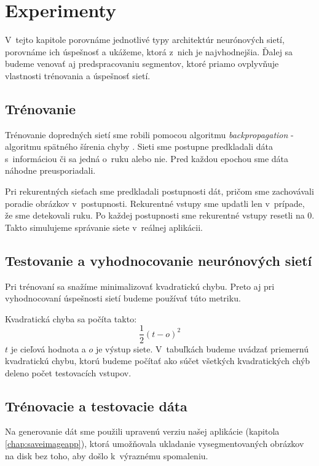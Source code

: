 \chapter{Experimenty}
\label{chap:experiments}

V~tejto kapitole porovnáme jednotlivé typy architektúr neurónových sietí, porovnáme ich úspešnosť a ukážeme, ktorá z~nich je najvhodnejšia. Ďalej sa budeme venovať aj predspracovaniu segmentov, ktoré priamo ovplyvňuje vlastnosti trénovania a úspešnosť sietí.
\bigskip

\section{Trénovanie}

Trénovanie dopredných sietí sme robili pomocou algoritmu \textit{backpropagation} - algoritmu spätného šírenia chyby \cite{haykin1999neural}. Sieti sme postupne predkladali dáta s~informáciou či sa jedná o~ruku alebo nie. Pred každou epochou sme dáta náhodne preusporiadali. 

Pri rekurentných sieťach sme predkladali postupnosti dát, pričom sme zachovávali poradie obrázkov v~postupnosti. Rekurentné vstupy sme updatli len v~prípade, že sme detekovali ruku. Po každej postupnosti sme rekurentné vstupy resetli na 0. Takto simulujeme správanie siete v~reálnej aplikácii.

\section{Testovanie a vyhodnocovanie neurónových sietí}
Pri trénovaní sa snažíme minimalizovať kvadratickú chybu. Preto aj pri vyhodnocovaní úspešnosti sietí budeme používať túto metriku.

Kvadratická chyba sa počíta takto: $$\frac{1}{2}(t-o)^2$$
$t$ je cieľová hodnota a $o$ je výstup siete. V~tabuľkách budeme uvádzať priemernú kvadratickú chybu, ktorú budeme počítať ako súčet všetkých kvadratických chýb deleno počet testovacích vstupov. 

\section{Trénovacie a testovacie dáta}

Na generovanie dát sme použili upravenú verziu našej aplikácie (kapitola \ref{chap:saveimageapp}), ktorá umožňovala ukladanie vysegmentovaných obrázkov na disk bez toho, aby došlo k~výraznému spomaleniu. 

